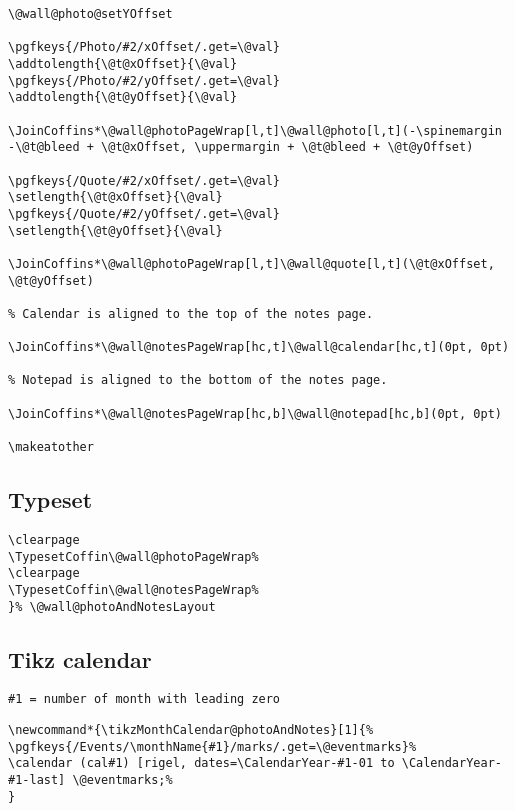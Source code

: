 \documentclass[11pt,oneside]{memoir-article}
\begin{document}
\begin{verbatim}
\@wall@photo@setYOffset

\pgfkeys{/Photo/#2/xOffset/.get=\@val}
\addtolength{\@t@xOffset}{\@val}
\pgfkeys{/Photo/#2/yOffset/.get=\@val}
\addtolength{\@t@yOffset}{\@val}

\JoinCoffins*\@wall@photoPageWrap[l,t]\@wall@photo[l,t](-\spinemargin -\@t@bleed + \@t@xOffset, \uppermargin + \@t@bleed + \@t@yOffset)

\pgfkeys{/Quote/#2/xOffset/.get=\@val}
\setlength{\@t@xOffset}{\@val}
\pgfkeys{/Quote/#2/yOffset/.get=\@val}
\setlength{\@t@yOffset}{\@val}

\JoinCoffins*\@wall@photoPageWrap[l,t]\@wall@quote[l,t](\@t@xOffset, \@t@yOffset)

% Calendar is aligned to the top of the notes page.

\JoinCoffins*\@wall@notesPageWrap[hc,t]\@wall@calendar[hc,t](0pt, 0pt)

% Notepad is aligned to the bottom of the notes page.

\JoinCoffins*\@wall@notesPageWrap[hc,b]\@wall@notepad[hc,b](0pt, 0pt)

\makeatother
\end{verbatim}

\subsection{Typeset}
\label{sec:org01a080b}

\begin{verbatim}
\clearpage
\TypesetCoffin\@wall@photoPageWrap%
\clearpage
\TypesetCoffin\@wall@notesPageWrap%
}% \@wall@photoAndNotesLayout
\end{verbatim}

\subsection{Tikz calendar}
\label{sec:org462f1f9}

\begin{verbatim}
#1 = number of month with leading zero
\end{verbatim}

\begin{verbatim}
\newcommand*{\tikzMonthCalendar@photoAndNotes}[1]{%
\pgfkeys{/Events/\monthName{#1}/marks/.get=\@eventmarks}%
\calendar (cal#1) [rigel, dates=\CalendarYear-#1-01 to \CalendarYear-#1-last] \@eventmarks;%
}
\end{verbatim}
\end{document}

